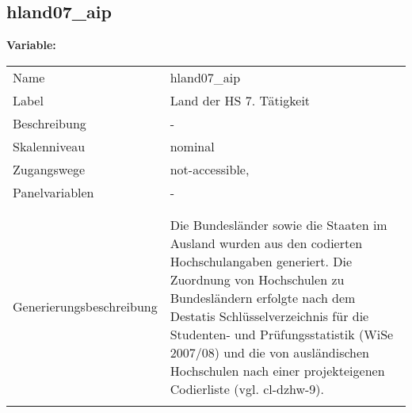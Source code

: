 	
	
	\subsection{hland07\_aip}
	\label{subSection:hland07_aip}

	\noindent\textbf{Variable:}\\
		\begin{tabular}{lL{11.3cm}}
			\label{tableVariable:hland07_aip}
			Name & hland07\_aip \\
			Label & Land der HS 7. Tätigkeit \\
			Beschreibung & - \\
			Skalenniveau & nominal \\
			Zugangswege &
				not-accessible,
 \\
			Panelvariablen & -
			 \\
			 \\
 \\
					Generierungsbeschreibung & Die Bundesländer sowie die Staaten im Ausland wurden aus den codierten Hochschulangaben generiert. Die Zuordnung von Hochschulen zu Bundesländern erfolgte nach dem Destatis Schlüsselverzeichnis für die Studenten- und Prüfungsstatistik (WiSe 2007/08) und die von ausländischen Hochschulen nach einer projekteigenen Codierliste (vgl. cl-dzhw-9).
				 \\	
			 \\
		\end{tabular}






	
	\newpage
